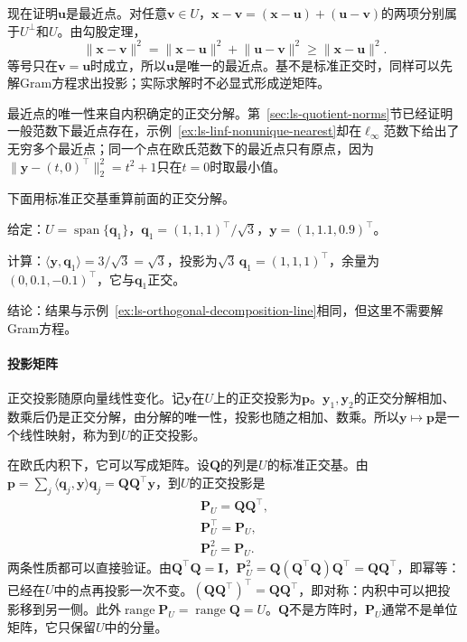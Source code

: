 现在证明$\bm u$是最近点。对任意$\bm v\in U$，$\bm x-\bm v=(\bm x-\bm u)+(\bm u-\bm v)$的两项分别属于$U^\perp$和$U$。由勾股定理，
\[
 \lVert\bm x-\bm v\rVert^2=\lVert\bm x-\bm u\rVert^2+\lVert\bm u-\bm v\rVert^2\geq\lVert\bm x-\bm u\rVert^2.
\]
等号只在$\bm v=\bm u$时成立，所以$\bm u$是唯一的最近点。基不是标准正交时，同样可以先解Gram方程求出投影；实际求解时不必显式形成逆矩阵。

最近点的唯一性来自内积确定的正交分解。第~\ref{sec:ls-quotient-norms}节已经证明一般范数下最近点存在，示例~\ref{ex:ls-linf-nonunique-nearest}却在$\ell_\infty$范数下给出了无穷多个最近点；同一个点在欧氏范数下的最近点只有原点，因为$\lVert\bm y-(t,0)^\top\rVert_2^2=t^2+1$只在$t=0$时取最小值。

下面用标准正交基重算前面的正交分解。
\begin{example}[用标准正交基重算正交分解]
\label{ex:ls-orthonormal-projection-line}
给定：$U=\operatorname{span}\{\bm q_1\}$，$\bm q_1=(1,1,1)^\top/\sqrt3$，$\bm y=(1,1.1,0.9)^\top$。

计算：$\langle\bm y,\bm q_1\rangle=3/\sqrt3=\sqrt3$，投影为$\sqrt3\,\bm q_1=(1,1,1)^\top$，余量为$(0,0.1,-0.1)^\top$，它与$\bm q_1$正交。

结论：结果与示例~\ref{ex:ls-orthogonal-decomposition-line}相同，但这里不需要解Gram方程。
\end{example}

\paragraph{投影矩阵}
\label{sec:ls-projection-matrices}
正交投影随原向量线性变化。记$\bm y$在$U$上的正交投影为$\bm p$。$\bm y_1,\bm y_2$的正交分解相加、数乘后仍是正交分解，由分解的唯一性，投影也随之相加、数乘。所以$\bm y\mapsto\bm p$是一个线性映射，称为到$U$的正交投影。

在欧氏内积下，它可以写成矩阵。设$\bm Q$的列是$U$的标准正交基。由$\bm p=\sum_j\langle\bm q_j,\bm y\rangle\bm q_j=\bm Q\bm Q^\top\bm y$，到$U$的正交投影是
\begin{equation}
\begin{gathered}
\bm P_U=\bm Q\bm Q^\top,\\
\bm P_U^\top=\bm P_U,\\
\bm P_U^2=\bm P_U.
\end{gathered}
\label{eq:linear-algebra-orthogonal-projector}
\end{equation}
两条性质都可以直接验证。由$\bm Q^\top\bm Q=\bm I$，$\bm P_U^2=\bm Q(\bm Q^\top\bm Q)\bm Q^\top=\bm Q\bm Q^\top$，即幂等：已经在$U$中的点再投影一次不变。$(\bm Q\bm Q^\top)^\top=\bm Q\bm Q^\top$，即对称：内积中可以把投影移到另一侧。此外$\operatorname{range}\bm P_U=\operatorname{range}\bm Q=U$。$\bm Q$不是方阵时，$\bm P_U$通常不是单位矩阵，它只保留$U$中的分量。


